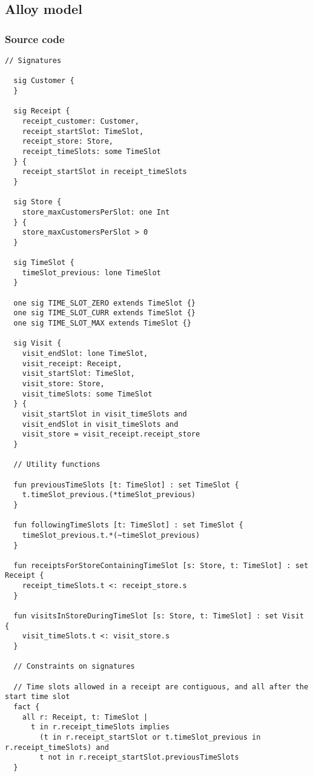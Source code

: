 \documentclass[../../main.tex]{subfiles}
\begin{document}
\subsection{Alloy model}

\subsubsection{Source code}

\begin{lstlisting}[language=alloy]
  // Signatures

  sig Customer {
  }
  
  sig Receipt {
    receipt_customer: Customer,
    receipt_startSlot: TimeSlot,
    receipt_store: Store,
    receipt_timeSlots: some TimeSlot
  } {
    receipt_startSlot in receipt_timeSlots
  }
  
  sig Store {
    store_maxCustomersPerSlot: one Int
  } {
    store_maxCustomersPerSlot > 0
  }
  
  sig TimeSlot {
    timeSlot_previous: lone TimeSlot
  }
  
  one sig TIME_SLOT_ZERO extends TimeSlot {}
  one sig TIME_SLOT_CURR extends TimeSlot {}
  one sig TIME_SLOT_MAX extends TimeSlot {}
  
  sig Visit {
    visit_endSlot: lone TimeSlot,
    visit_receipt: Receipt,
    visit_startSlot: TimeSlot,
    visit_store: Store,
    visit_timeSlots: some TimeSlot
  } {
    visit_startSlot in visit_timeSlots and
    visit_endSlot in visit_timeSlots and
    visit_store = visit_receipt.receipt_store
  }
  
  // Utility functions
  
  fun previousTimeSlots [t: TimeSlot] : set TimeSlot {
    t.timeSlot_previous.(*timeSlot_previous)
  }
  
  fun followingTimeSlots [t: TimeSlot] : set TimeSlot {
    timeSlot_previous.t.*(~timeSlot_previous)
  }
  
  fun receiptsForStoreContainingTimeSlot [s: Store, t: TimeSlot] : set Receipt {
    receipt_timeSlots.t <: receipt_store.s
  }
  
  fun visitsInStoreDuringTimeSlot [s: Store, t: TimeSlot] : set Visit {
    visit_timeSlots.t <: visit_store.s
  }
  
  // Constraints on signatures
  
  // Time slots allowed in a receipt are contiguous, and all after the start time slot
  fact {
    all r: Receipt, t: TimeSlot |
      t in r.receipt_timeSlots implies
        (t in r.receipt_startSlot or t.timeSlot_previous in r.receipt_timeSlots) and
        t not in r.receipt_startSlot.previousTimeSlots
  }
  

\end{lstlisting}
\end{document}
